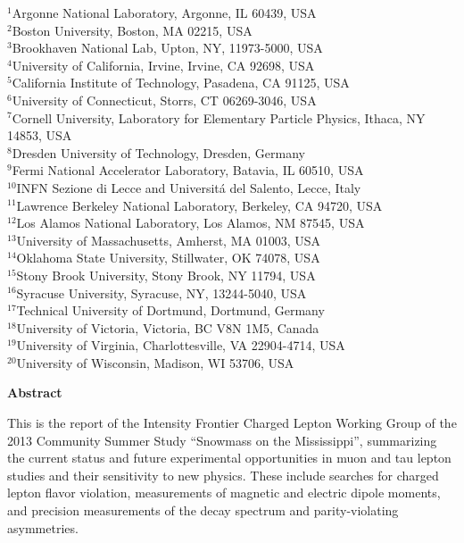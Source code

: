 \begin{center}

$^{1}$Argonne National Laboratory, Argonne, IL 60439, USA\\
$^{2}$Boston University, Boston, MA 02215, USA\\
$^{3}$Brookhaven National Lab, Upton, NY, 11973-5000, USA\\
$^{4}$University of California, Irvine, Irvine, CA 92698, USA\\
$^{5}$California Institute of Technology, Pasadena, CA 91125, USA\\
$^{6}$University of Connecticut, Storrs, CT 06269-3046, USA\\
$^{7}$Cornell University, Laboratory for Elementary Particle Physics, Ithaca, NY 14853, USA\\
$^{8}$Dresden University of Technology, Dresden, Germany\\
$^{9}$Fermi National Accelerator Laboratory, Batavia, IL 60510, USA\\
$^{10}$INFN Sezione di Lecce and Universit\'a del Salento, Lecce, Italy\\
$^{11}$Lawrence Berkeley National Laboratory, Berkeley, CA 94720, USA\\
$^{12}$Los Alamos National Laboratory, Los Alamos, NM 87545, USA\\
$^{13}$University of Massachusetts, Amherst, MA 01003, USA\\
$^{14}$Oklahoma State University, Stillwater, OK 74078, USA\\
$^{15}$Stony Brook University, Stony Brook, NY 11794, USA\\
$^{16}$Syracuse University, Syracuse, NY, 13244-5040, USA\\
$^{17}$Technical University of Dortmund, Dortmund, Germany\\
$^{18}$University of Victoria, Victoria, BC V8N 1M5, Canada\\
$^{19}$University of Virginia, Charlottesville, VA 22904-4714, USA\\
$^{20}$University of Wisconsin, Madison, WI 53706, USA\\

\end{center}

\begin{center}
{\large\bf Abstract}

\parbox{\linewidth}{
This is the report of the Intensity Frontier Charged Lepton Working Group of the 2013 Community Summer Study ``Snowmass on the Mississippi'', summarizing the current status and future experimental opportunities in muon and tau lepton studies and their sensitivity to new physics. These include searches for charged lepton flavor violation, measurements of magnetic and electric dipole moments, and precision measurements of the decay spectrum and parity-violating asymmetries.}

\end{center}



